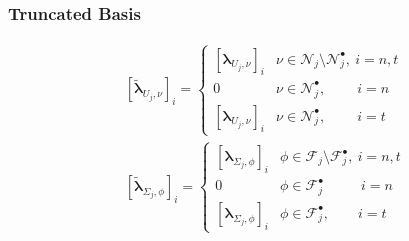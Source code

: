 \documentclass[8pt, oneside]{beamer}   	%
\newcommand{\blambda}{\boldsymbol{\lambda}}
\begin{document}
\begin{frame}
\frametitle{Truncated Basis}
\footnotesize
\begin{align*}
\label{truncatedbasis}
&
\left[\tilde{\blambda}_{U_j,\nu} \right]_i=
\begin{cases}
\left[\blambda_{U_j,\nu}\right]_i  & \nu \in \mathcal{N}_j \setminus  \mathcal{N}_{j}^{\bullet}, \: {i=n, t}   \\
0  & \nu \in   \mathcal{N}_{j}^{\bullet},\qquad \: {i=n}   \\
\left[\blambda_{U_j,\nu}\right]_i  & \nu \in\mathcal{N}_{j}^{\bullet}  , \qquad \: {i=t}   
\end{cases}
\\
&\left[\tilde{\blambda}_{\Sigma_j,\phi} \right]_i=
\begin{cases}
\left[\blambda_{\Sigma_j,\phi}\right]_i  & \phi \in \mathcal{F}_j \setminus  \mathcal{F}_{j}^{\bullet}, \: {i=n, t}   \\
0  & \phi \in   \mathcal{F}_{j}^{\bullet} \quad \quad\:\:\: {i=n}   \\
\left[\blambda_{\Sigma_j,\phi}\right]_i  & \phi \in\mathcal{F}_{j}^{\bullet}  , \qquad {i=t}   
\end{cases}
\end{align*}
\end{frame}
\end{document}
